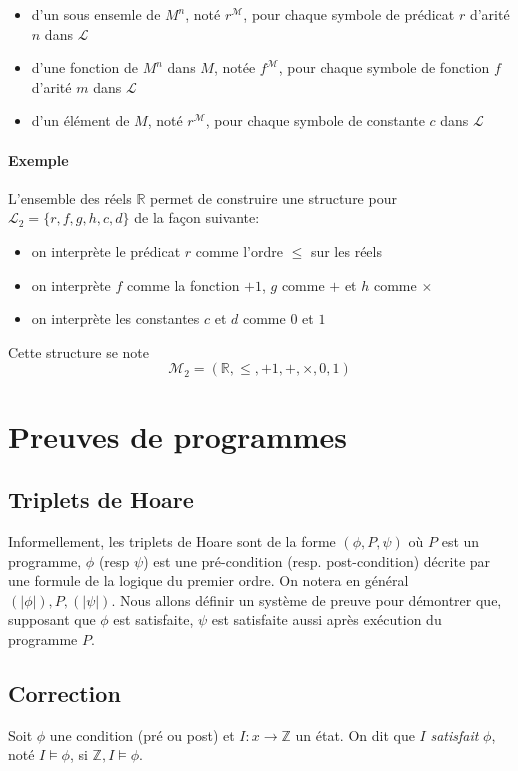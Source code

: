 \documentclass[a4paper]{article}
\begin{document}
   \begin{itemize}
     \item d'un sous ensemle de $M^n$, noté $r^{\mathcal{M}}$, pour chaque symbole
     de prédicat $r$ d'arité $n$ dans $\mathcal{L}$
     \item d'une fonction de $M^n$ dans $M$, notée $f^{\mathcal{M}}$, pour chaque symbole
     de fonction $f$ d'arité $m$ dans $\mathcal{L}$
     \item d'un élément de $M$, noté $r^{\mathcal{M}}$, pour chaque symbole de 
     constante $c$ dans $\mathcal{L}$
   \end{itemize}

   \paragraph{Exemple} L'ensemble des réels $\mathbb{R}$ permet de construire une 
   structure pour $\mathcal{L}_2 = \{r, f, g, h, c, d\}$ de la façon suivante:

   \begin{itemize}
     \item on interprète le prédicat $r$ comme l'ordre $\leq$ sur les réels
     \item on interprète $f$ comme la fonction $+1$, $g$ comme $+$ et $h$ comme $\times$
     \item on interprète les constantes $c$ et $d$ comme $0$ et $1$
   \end{itemize}
   Cette structure se note $$ \mathcal{M}_2 = (\mathbb{R}, \leq, +1, +, \times, 0, 1) $$ 


\section{Preuves de programmes}
  \subsection{Triplets de Hoare}
  Informellement, les triplets de Hoare sont de la forme $(\phi, P, \psi)$ où $P$
  est un programme, $\phi$ (resp $\psi$) est une pré-condition (resp. post-condition) 
  décrite par une formule de la logique du premier ordre. On notera en général $(|\phi|), P, (|\psi|)$.
  Nous allons définir un système de preuve pour démontrer que, supposant que $\phi$
  est satisfaite, $\psi$ est satisfaite aussi après exécution du programme $P$.

  \subsection{Correction}
  Soit $\phi$ une condition (pré ou post) et $I:x\rightarrow \mathbb{Z}$ un état. 
  On dit que $I$ \textit{satisfait} $\phi$, noté $I \vDash \phi$, si $\mathbb{Z}, I \vDash \phi$.\\
\end{document}
